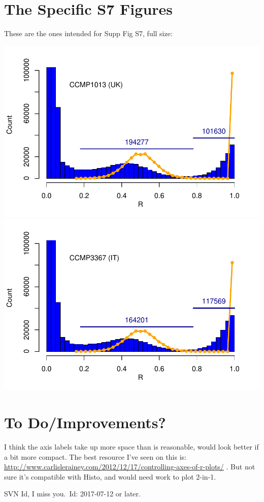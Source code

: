 \documentclass{article}\usepackage[]{graphicx}\usepackage[]{color}
\begin{document}
\section{The Specific S7 Figures}

These are the ones intended for Supp Fig S7, full size:

\noindent
\includegraphics{FigS7-hwe-histo-figs-mine/S7-full-qfiltered-1013chronly.pdf}\\
\includegraphics{FigS7-hwe-histo-figs-mine/S7-full-qfiltered-3367chronly.pdf}

\section{To Do/Improvements?}

I think the axis labels take up more space than is reasonable, would look better if a bit more 
compact.  The best resource I've seen on this is:
\href{http://www.carlislerainey.com/2012/12/17/controlling-axes-of-r-plots/}{http://www.carlislerainey.com/2012/12/17/controlling-axes-of-r-plots/} .
But not sure it's compatible with Histo, and would need work to plot 2-in-1.


\vfill\footnotesize\flushright SVN Id, I miss you.\  $ $Id: 2017-07-12 or later. $ $
\end{document}
